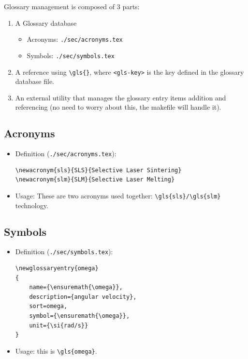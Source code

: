 \documentclass[11pt]{article}
\begin{document}
Glossary management is composed of 3 parts:
\begin{enumerate}
\item A Glossary database 
\begin{itemize}
\item Acronyms: \texttt{./sec/acronyms.tex}
\item Symbols: \texttt{./sec/symbols.tex}
\end{itemize}
\item A reference using \texttt{\textbackslash{}gls\{<gls-key>\}}, where \texttt{<gls-key>} is the key defined in
the glossary database file.
\item An external utility that manages the glossary entry items addition and
referencing (no need to worry about this, the makefile will handle it).
\end{enumerate}
\subsection{Acronyms}
\label{sec:orgc5e2914}
\begin{itemize}
\item Definition (\texttt{./sec/acronyms.tex}):
\lstset{language=[LaTeX]TeX,label= ,caption= ,captionpos=b,numbers=none}
\begin{lstlisting}
\newacronym{sls}{SLS}{Selective Laser Sintering}
\newacronym{slm}{SLM}{Selective Laser Melting}
\end{lstlisting}
\item Usage: These are two acronyms used together: \texttt{\textbackslash{}gls\{sls\}/\textbackslash{}gls\{slm\}} technology.
\end{itemize}

\subsection{Symbols}
\label{sec:orgd66ae0b}
\begin{itemize}
\item Definition (\texttt{./sec/symbols.tex}):
\lstset{language=[LaTeX]TeX,label= ,caption= ,captionpos=b,numbers=none}
\begin{lstlisting}
\newglossaryentry{omega}
{
    name={\ensuremath{\omega}},
    description={angular velocity},
    sort=omega,
    symbol={\ensuremath{\omega}},
    unit={\si{rad/s}}
}
\end{lstlisting}
\item Usage: this is \texttt{\textbackslash{}gls\{omega\}}.
\end{itemize}
\end{document}
